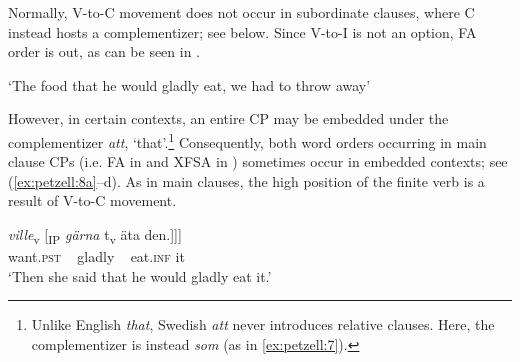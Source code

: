 \documentclass[output=paper,colorlinks,citecolor=brown,draft,draftmode]{langscibook}
\begin{document}
Normally, V-to-C movement does not occur in subordinate clauses, where C instead hosts a complementizer; see  below. Since V-to-I is not an option, FA order is out, as can be seen in .


\ea\label{ex:petzell:7}
\glt `The food that he would gladly eat, we had to throw away’

\z
\z


However, in certain contexts, an entire CP may be embedded under the complementizer \textit{att}, ‘that’.\footnote{Unlike English \textit{that}, Swedish \textit{att} never introduces relative clauses. Here, the complementizer is instead \textit{som} (as in \ref{ex:petzell:7}).} Consequently, both word orders occurring in main clause CPs (i.e. FA in  and XFSA in ) sometimes occur in embedded contexts; see (\ref{ex:petzell:8a}–d). As in main clauses, the high position of the finite verb is a result of V-to-C movement.


\ea\label{ex:petzell:8}
\ea{\label{ex:petzell:8a}
\gll Då   sa      hon [\textsubscript{CP}    att [\textsubscript{CP}  han                  \\
    then    say.\textsc{pst}  she  ~    that   ~   he         \\}
\gll     \textit{{ville}}\textsubscript{v}  [\textsubscript{IP}       \textit{{gärna}}   t\textsubscript{v}  äta      den.]]]   \\
    want.\textsc{pst}  ~  gladly   ~  eat.\textsc{inf}    it\\
\glt `Then she said that he would gladly eat it.’  \\
\end{document}
